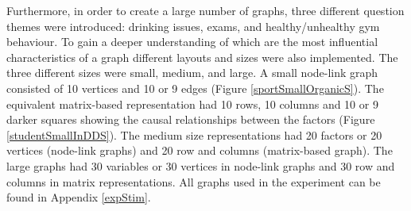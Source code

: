 \documentclass{l4proj}
\begin{document}
Furthermore, in order to create a large number of graphs, three different question themes were introduced: drinking issues, exams, and healthy/unhealthy gym behaviour. To gain a deeper understanding of which are the most influential characteristics of a graph different layouts and sizes were also implemented. The three different sizes were small, medium, and large. A small node-link graph consisted of 10 vertices and 10 or 9 edges (Figure \ref{sportSmallOrganicS}). The equivalent matrix-based representation had 10 rows, 10 columns and 10 or 9 darker squares showing the causal relationships between the factors (Figure \ref{studentSmallInDDS}). The medium size representations had 20 factors or 20 vertices (node-link graphs) and 20 row and columns (matrix-based graph). The large graphs had 30 variables or 30 vertices in node-link graphs and 30 row and columns in matrix representations. All graphs used in the experiment can be found in Appendix \ref{expStim}.
\end{document}
